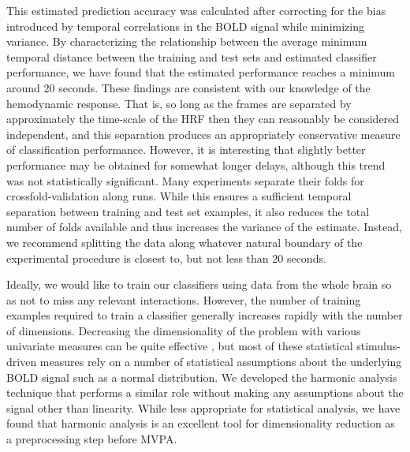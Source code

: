 \documentclass[review,1p,authoryear]{elsarticle}
\begin{document}
This estimated prediction accuracy was calculated after correcting for the bias introduced by temporal correlations in the BOLD signal while minimizing variance.
By characterizing the relationship between the average minimum temporal distance between the training and test sets and estimated classifier performance, we have found that the estimated performance reaches a minimum around 20 seconds.
These findings are consistent with our knowledge of the hemodynamic response.
That is, so long as the frames are separated by approximately the time-scale of the HRF then they can reasonably be considered independent, and this separation produces an appropriately conservative measure of classification performance. 
However, it is interesting that slightly better performance may be obtained for somewhat longer delays, although this trend was not statistically significant.
Many experiments separate their folds for crossfold-validation along runs.
While this ensures a sufficient temporal separation between training and test set examples, it also reduces the total number of folds available and thus increases the variance of the estimate.
Instead, we recommend splitting the data along whatever natural boundary of the experimental procedure is closest to, but not less than 20 seconds.

Ideally, we would like to train our classifiers using data from the whole brain so as not to miss any relevant interactions.
However, the number of training examples required to train a classifier generally increases rapidly with the number of dimensions.
Decreasing the dimensionality of the problem with various univariate measures can be quite effective \citep{Norman2006,Pereira2009}, but most of these statistical stimulus-driven measures rely on a number of statistical assumptions about the underlying BOLD signal such as a normal distribution.
We developed the harmonic analysis technique that performs a similar role without making any assumptions about the signal other than linearity.
While less appropriate for statistical analysis, we have found that harmonic analysis is an excellent tool for dimensionality reduction as a preprocessing step before MVPA.
\end{document}
